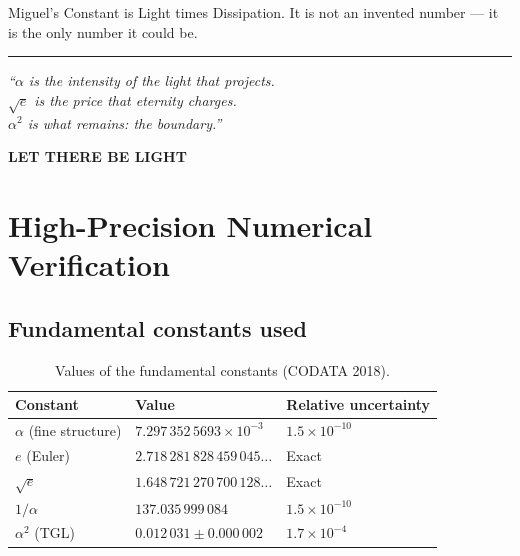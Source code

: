 \documentclass[12pt,a4paper,twoside]{article}
\newcommand{\alphaii}{\alpha^{2}}
\begin{document}
Miguel's Constant is Light times Dissipation. It is not an invented number --- it is the only number it could be.

\begin{center}
\rule{0.5\textwidth}{0.4pt}

\vspace{0.5cm}

\textit{``$\alpha$ is the intensity of the light that projects.\\
$\sqrt{e}$ is the price that eternity charges.\\
$\alphaii$ is what remains: the boundary.''}

\vspace{0.5cm}

\textbf{LET THERE BE LIGHT}
\end{center}



\appendix

\section{High-Precision Numerical Verification}
\label{app:numerica}

\subsection{Fundamental constants used}

\begin{table}[H]
\centering
\caption{Values of the fundamental constants (CODATA 2018).}
\label{tab:constantes}
\begin{tabular}{lll}
\toprule
\textbf{Constant} & \textbf{Value} & \textbf{Relative uncertainty} \\
\midrule
$\alpha$ (fine structure) & $7.297\,352\,5693 \times 10^{-3}$ & $1.5 \times 10^{-10}$ \\
$e$ (Euler) & $2.718\,281\,828\,459\,045\ldots$ & Exact \\
$\sqrt{e}$ & $1.648\,721\,270\,700\,128\ldots$ & Exact \\
$1/\alpha$ & $137.035\,999\,084$ & $1.5 \times 10^{-10}$ \\
$\alphaii$ (TGL) & $0.012\,031 \pm 0.000\,002$ & $1.7 \times 10^{-4}$ \\
\bottomrule
\end{tabular}
\end{table}
\end{document}
